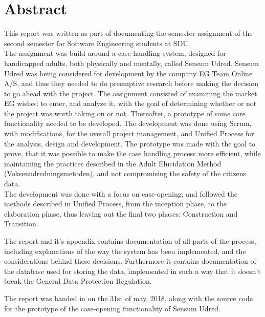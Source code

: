 \documentclass[../main.tex]{subfiles}
\begin{document}
\section*{Abstract}
This report was written as part of documenting the semester assignment of the second semester for Software Engineering students at SDU.\\
The assignment was build around a case handling system, designed for handicapped adults, both physically and mentally, called Sensum Udred. Sensum Udred was being considered for development by the company EG Team Online A/S, and thus they needed to do preemptive research before making the decision to go ahead with the project. The assignment consisted of examining the market EG wished to enter, and analyze it, with the goal of determining whether or not the project was worth taking on or not. Thereafter, a prototype of some core functionality needed to be developed. The development was done using Scrum, with modifications,	 for the overall project management, and Unified Process for the analysis, design and development. The prototype was made with the goal to prove, that it was possible to make the case handling process more efficient, while maintaining the practices described in the Adult Elucidation Method (Voksenudredningsmetoden), and not compromising the safety of the citizens data. \\
The development was done with a focus on case-opening, and followed the methods described in Unified Process, from the inception phase, to the elaboration phase, thus leaving out the final two phases: Construction and Transition. 

The report and it's appendix contains documentation of all parts of the process, including explanations of the way the system has been implemented, and the considerations behind these decisions. Furthermore it contains documentation of the database used for storing the data, implemented in such a way that it doesn't break the General Data Protection Regulation.

The report was handed in on the 31st of may, 2018, along with the source code for the prototype of the case-opening functionality of Sensum Udred.




\newpage
\end{document}
